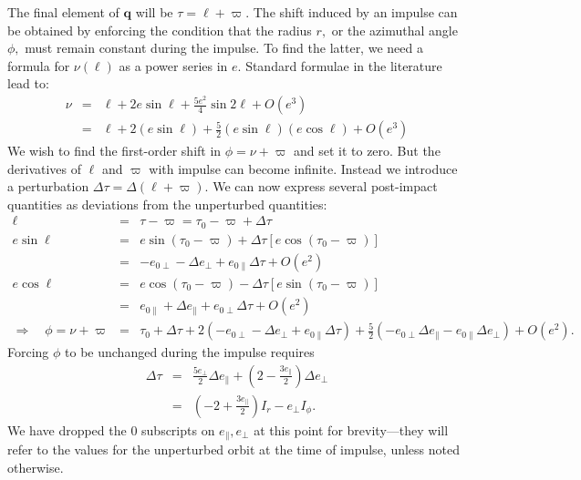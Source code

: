 \documentclass[linenumbers, onecolumn]{aastex631}
\newcommand{\eg}{\textit{e.g.\/}}
\newcommand{\vecq}{\mathbf{q}}
\newcommand{\lop}{\varpi}   %
\newcommand{\ma}{\ell}  %
\begin{document}
The final element of $\vecq$ will be $\tau=\ma+\lop.$  The shift
induced by an impulse can be obtained by enforcing the
condition that the radius $r,$ or the azimuthal angle $\phi,$ must
remain constant during the impulse.  To find the latter, we need a
formula for $\nu(\ma)$ as a power series in $e.$  Standard formulae in
the literature \citep[\eg][]{tremaine} lead to:
\begin{eqnarray}
  \nu & = & \ma + 2e \sin \ma + \frac{5e^2}{4} \sin 2\ma + O(e^3) \\
  \label{eq:nue2}
    & = & \ma + 2(e\sin \ma) + \frac{5}{2} (e \sin \ma) (e \cos \ma) + O(e^3) 
\end{eqnarray}
We wish to find the first-order shift in $\phi=\nu + \lop$ and set it
to zero.  But the derivatives of $\ma$ and $\lop$ with impulse can become infinite.  Instead we introduce a perturbation $\Delta\tau = \Delta(\ma+\lop).$ We can now express several post-impact quantities as deviations from the unperturbed quantities:
\begin{eqnarray}
  \ma & = & \tau-\lop = \tau_0 -\lop + \Delta\tau \\
  e \sin \ma & = & e \sin (\tau_0 -\lop) + \Delta\tau \left[ e \cos  (\tau_0 -\lop)\right] \nonumber \\
\label{eq:esinM}
    & = & -e_{0\perp}-\Delta e_\perp + e_{0\parallel} \Delta\tau +O(e^2) \\
  e \cos \ma & = & e \cos (\tau_0 -\lop) - \Delta\tau \left[ e \sin  (\tau_0 -\lop)\right] \nonumber\\
\label{eq:ecosM}
    & = & e_{0\parallel}+\Delta e_\parallel + e_{0\perp} \Delta\tau +O(e^2) \\
\Rightarrow \quad \phi =\nu+\lop & = & \tau_0 + \Delta \tau + 2( -e_{0\perp}-\Delta e_\perp + e_{0\parallel} \Delta\tau )
                              + \frac{5}{2}\left( -e_{0\perp}\Delta e_\parallel-e_{0\parallel}\Delta e_\perp\right) + O(e^2).
\label{eq:phi}
\end{eqnarray}
Forcing $\phi$ to be unchanged during the impulse requires
\begin{eqnarray}
  \Delta\tau & = & \frac{5 e_\perp}{2} \Delta e_\parallel + \left(2-\frac{3e_\parallel}{2}\right) \Delta e_\perp \\
             & = & \left(-2+\frac{3e_\parallel}{2}\right) I_r - e_\perp I_\phi.
                   \label{eq:dtau0}
\end{eqnarray}
We have dropped the 0 subscripts on $e_\parallel,e_\perp$ at this point for brevity---they will refer to the values for the unperturbed orbit at the time of impulse, unless noted otherwise.
\end{document}
